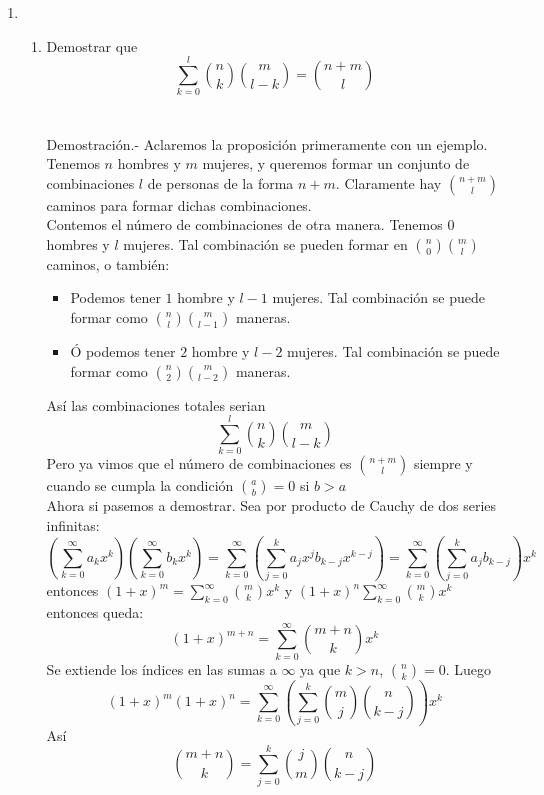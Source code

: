 \begin{enumerate}
\item 
\begin{enumerate}[\bfseries (a)]
\item Demostrar que $$\displaystyle\sum_{k=0}^{l} {n \choose k} {m \choose l-k} = {n+m \choose l}$$\\\\
Demostración.- \; Aclaremos la proposición primeramente con un ejemplo.\\
Tenemos $n$ hombres y $m$ mujeres, y queremos formar un conjunto de combinaciones $l$ de personas de la forma $n+m$. Claramente hay ${n+m \choose l}$ caminos para formar dichas combinaciones.\\
Contemos el número de combinaciones de otra manera. Tenemos $0$ hombres y $l$ mujeres. Tal combinación se pueden formar en ${n \choose 0 } {m \choose l}$ caminos, o también:
\begin{itemize}
\item Podemos tener $1$ hombre y $l-1$ mujeres. Tal combinación se puede formar como ${n \choose l}{m \choose l-1}$ maneras.
\item Ó podemos tener $2$ hombre y $l-2$ mujeres. Tal combinación se puede formar como ${n \choose 2}{m \choose l-2}$ maneras.
\end{itemize}
Así las combinaciones totales serian $$\displaystyle\sum_{k=0}^l {n \choose k}{m \choose l -k}$$
Pero ya vimos que el número de combinaciones es ${n+m \choose l}$ siempre y cuando se cumpla la condición ${a \choose b} = 0$ si $b>a$\\
Ahora si pasemos a demostrar. Sea por producto de Cauchy de dos series infinitas:
$$\left( \displaystyle\sum_{k=0}^{\infty} a_k x^k \right) \left( \displaystyle\sum_{k=0}^{\infty} b_k x^k \right) = \sum_{k=0}^{\infty} \left( \displaystyle\sum_{j=0}^{k} a_j x^j b_{k-j} x^{k-j}\right) = \sum_{k=0}^{\infty} \left( \displaystyle\sum_{j=0}^{k} a_j b_{k-j} \right) x^k$$ entonces $(1+x)^m = \displaystyle\sum_{k=0}^{\infty} {m \choose k}x^k$ y $(1+x)^n \displaystyle\sum_{k=0}^{\infty} {m \choose k}x^k$ entonces queda:
$$(1+x)^{m+n} = \sum_{k=0}^{\infty} {m+n \choose k} x^k$$
Se extiende los índices en las sumas a $\infty$  ya que $k>n$, ${n \choose k} = 0 $. Luego 
$$(1+x)^m (1+x)^n = \displaystyle\sum_{k=0}^{\infty} \left( \sum_{j=0}^k {m \choose j} {n \choose k-j} \right) x^k$$ Así 
$${m+n \choose k} = \displaystyle\sum_{j=0}^k {j \choose m}{n \choose k-j}$$\\\\


\end{enumerate}
\end{enumerate}
